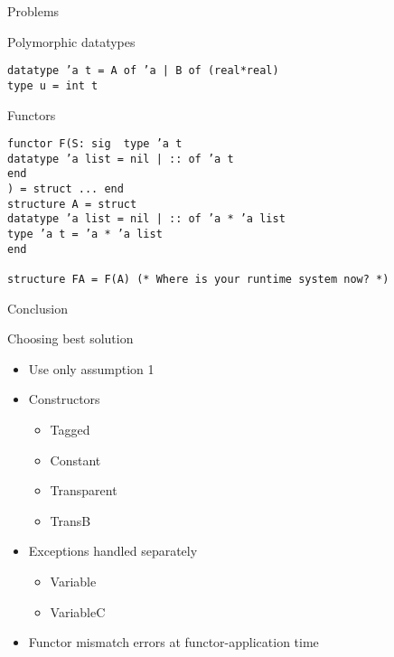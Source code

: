 \documentclass[presentation]{beamer}
\begin{document}
\begin{frame}[fragile]{Problems}
  \begin{block}{Polymorphic datatypes}
\begin{verbatim}
datatype ’a t = A of ’a | B of (real*real)
type u = int t
\end{verbatim}
  \end{block}
  \pause
  \begin{block}{Functors}
\begin{verbatim}
functor F(S: sig  type ’a t
datatype ’a list = nil | :: of ’a t
end
) = struct ... end
structure A = struct
datatype ’a list = nil | :: of ’a * ’a list
type ’a t = ’a * ’a list
end

structure FA = F(A) (* Where is your runtime system now? *)
\end{verbatim}
  \end{block}
\end{frame}

\begin{frame}{Conclusion}
  \begin{block}{Choosing best solution}
    \begin{itemize}
    \item Use only assumption 1
    \item Constructors
      \begin{itemize}
      \item Tagged
      \item Constant
      \item Transparent
      \item TransB
      \end{itemize} 
    \item Exceptions handled separately
      \begin{itemize}
      \item Variable
      \item VariableC
      \end{itemize}
    \item Functor mismatch errors at functor-application time
    \end{itemize} 
  \end{block}
\end{frame}
\end{document}
